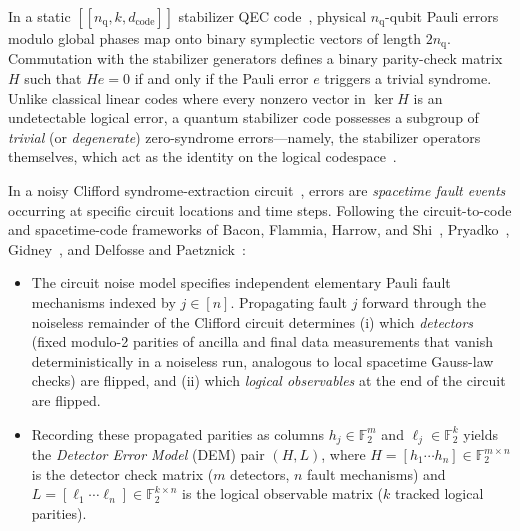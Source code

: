 \documentclass[12pt]{article}
\theoremstyle{definition}
\newcommand{\Ftwo}{\mathbb{F}_2}
\begin{document}
In a static $[[n_{\mathrm{q}}, k, d_{\mathrm{code}}]]$ stabilizer QEC code~\cite{Gottesman1997,CalderbankShor1996,
Steane1996}, physical $n_{\mathrm{q}}$-qubit Pauli errors modulo global phases map onto binary symplectic vectors
of length $2 n_{\mathrm{q}}$. Commutation with the stabilizer generators defines a binary parity-check matrix $H$
such that $H e = 0$ if and only if the Pauli error $e$ triggers a trivial syndrome. Unlike classical linear codes
where every nonzero vector in $\ker H$ is an undetectable logical error, a quantum stabilizer code possesses a
subgroup of \emph{trivial} (or \emph{degenerate}) zero-syndrome errors---namely, the stabilizer operators
themselves, which act as the identity on the logical
codespace~\cite{DennisKitaevLandahlPreskill2002,PanteleevKalachev2021}.

In a noisy Clifford syndrome-extraction circuit~\cite{Fowler2012,Gidney2021Stim}, errors are \emph{spacetime fault
events} occurring at specific circuit locations and time steps. Following the circuit-to-code and spacetime-code
frameworks of Bacon, Flammia, Harrow, and Shi~\cite{BaconFlammiaHarrowShi2017}, Pryadko~\cite{Pryadko2020MLD},
Gidney~\cite{Gidney2021Stim}, and Delfosse and Paetznick~\cite{DelfossePaetznick2023}:
\begin{itemize}
  \item The circuit noise model specifies independent elementary Pauli fault mechanisms indexed by $j \in [n]$.
    Propagating fault $j$ forward through the noiseless remainder of the Clifford circuit determines (i) which
    \emph{detectors} (fixed modulo-2 parities of ancilla and final data measurements that vanish deterministically
    in a noiseless run, analogous to local spacetime Gauss-law checks) are flipped, and (ii) which \emph{logical
    observables} at the end of the circuit are flipped.
  \item Recording these propagated parities as columns $h_j \in \Ftwo^m$ and $\ell_j \in \Ftwo^k$ yields the
    \emph{Detector Error Model} (DEM) pair $(H, L)$, where $H = [h_1 \cdots h_n] \in \Ftwo^{m \times n}$ is the
    detector check matrix ($m$ detectors, $n$ fault mechanisms) and $L = [\ell_1 \cdots \ell_n] \in \Ftwo^{k
    \times n}$ is the logical observable matrix ($k$ tracked logical parities).
\end{itemize}
\end{document}
